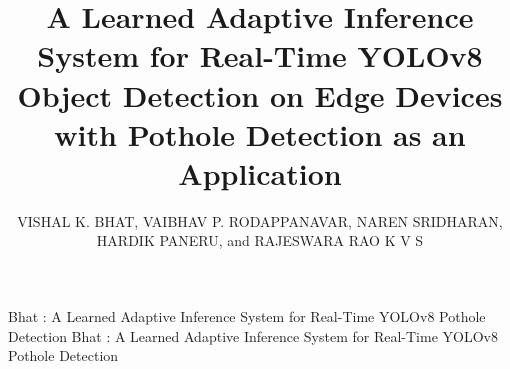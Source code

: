 \documentclass{ieeeaccess}
\begin{document}

\title{A Learned Adaptive Inference System for Real-Time YOLOv8 Object Detection on Edge Devices with Pothole Detection as an Application}

\author{
\uppercase{Vishal K. Bhat},
\uppercase{Vaibhav P. Rodappanavar},
\uppercase{Naren Sridharan},
\uppercase{Hardik Paneru}, and
\uppercase{Rajeswara Rao K V S}}

\address[1]{Department of Computer Science, RV College of Engineering, Bengaluru, Karnataka 560059, India (e-mail: vishalkbhat.cs23@rvce.edu.in; vaibhavp.cs23@rvce.edu.in)}
\address[2]{Department of Electronics and Communication Engineering, RV College of Engineering, Bengaluru, Karnataka 560059, India (e-mail: narensridharan.ec23@rvce.edu.in; hardikpaneru.ec23@rvce.edu.in)}
\address[3]{Department of Industrial Engineering \& Management, RV College of Engineering, Bengaluru, Karnataka 560059, India (e-mail: rajeswararaokvs@rvce.edu.in)}


\markboth
{Bhat \headeretal: A Learned Adaptive Inference System for Real-Time YOLOv8 Pothole Detection}
{Bhat \headeretal: A Learned Adaptive Inference System for Real-Time YOLOv8 Pothole Detection}

\end{document}
